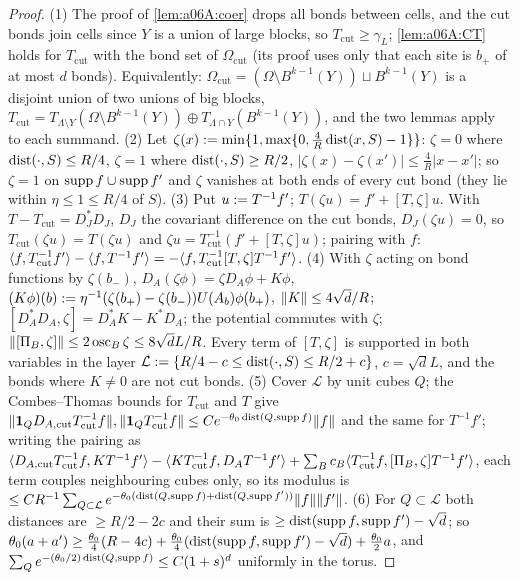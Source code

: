 \begin{proof}
(1) The proof of \cref{lem:a06A:coer} drops all bonds between cells, and the cut bonds join cells since $Y$ is a union of large blocks, so $T_{\mathrm{cut}}\ge\gamma_L$; \cref{lem:a06A:CT} holds for $T_{\mathrm{cut}}$ with the bond set of $\Omega_{\mathrm{cut}}$ (its proof uses only that each site is $b_+$ of at most $d$ bonds). Equivalently: $\Omega_{\mathrm{cut}}=(\Omega\setminus B^{k-1}(Y))\sqcup B^{k-1}(Y)$ is a disjoint union of two unions of big blocks, $T_{\mathrm{cut}}=T_{\Lambda\setminus Y}(\Omega\setminus B^{k-1}(Y))\oplus T_{\Lambda\cap Y}(B^{k-1}(Y))$, and the two lemmas apply to each summand. (2) Let $\zeta(x):=\min\{1,\max\{0,\frac4R\operatorname{dist}(x,S)-1\}\}$: $\zeta=0$ where $\operatorname{dist}(\cdot,S)\le R/4$, $\zeta=1$ where $\operatorname{dist}(\cdot,S)\ge R/2$, $|\zeta(x)-\zeta(x')|\le\frac4R|x-x'|$; so $\zeta=1$ on $\operatorname{supp} f\cup\operatorname{supp} f'$ and $\zeta$ vanishes at both ends of every cut bond (they lie within $\eta\le1\le R/4$ of $S$). (3) Put $u:= T^{-1}f'$; $T(\zeta u)=f'+[T,\zeta]u$. With $T-T_{\mathrm{cut}}=D_J^*D_J$, $D_J$ the covariant difference on the cut bonds, $D_J(\zeta u)=0$, so $T_{\mathrm{cut}}(\zeta u)=T(\zeta u)$ and $\zeta u=T_{\mathrm{cut}}^{-1}(f'+[T,\zeta]u)$; pairing with $f$: $\langle f,T_{\mathrm{cut}}^{-1}f'\rangle-\langle f,T^{-1}f'\rangle=-\langle f,T_{\mathrm{cut}}^{-1}[T,\zeta]T^{-1}f'\rangle$. (4) With $\zeta$ acting on bond functions by $\zeta(b_-)$, $D_A(\zeta\phi)=\zeta D_A\phi+K\phi$, $(K\phi)(b):=\eta^{-1}(\zeta(b_+)-\zeta(b_-))U(A_b)\phi(b_+)$, $\lVert K\rVert\le4\sqrt d/R$; $[D_A^*D_A,\zeta]=D_A^*K-K^*D_A$; the potential commutes with $\zeta$; $\lVert [\Pi_B,\zeta]\rVert\le2\operatorname{osc}_B\zeta\le8\sqrt dL/R$. Every term of $[T,\zeta]$ is supported in both variables in the layer $\mathcal L:=\{R/4-c\le\operatorname{dist}(\cdot,S)\le R/2+c\}$, $c=\sqrt dL$, and the bonds where $K\ne0$ are not cut bonds. (5) Cover $\mathcal L$ by unit cubes $Q$; the Combes--Thomas bounds for $T_{\mathrm{cut}}$ and $T$ give $\lVert \mathbf 1_QD_{A,\mathrm{cut}}T_{\mathrm{cut}}^{-1}f\rVert,\lVert \mathbf 1_QT_{\mathrm{cut}}^{-1}f\rVert\le Ce^{-\theta_0\operatorname{dist}(Q,\operatorname{supp} f)}\lVert f\rVert$ and the same for $T^{-1}f'$; writing the pairing as $\langle D_{A,\mathrm{cut}}T_{\mathrm{cut}}^{-1}f,KT^{-1}f'\rangle-\langle KT_{\mathrm{cut}}^{-1}f,D_AT^{-1}f'\rangle+\sum_Bc_B\langle T_{\mathrm{cut}}^{-1}f,[\Pi_B,\zeta]T^{-1}f'\rangle$, each term couples neighbouring cubes only, so its modulus is $\le CR^{-1}\sum_{Q\subset\mathcal L}e^{-\theta_0(\operatorname{dist}(Q,\operatorname{supp} f)+\operatorname{dist}(Q,\operatorname{supp} f'))}\lVert f\rVert\lVert f'\rVert$. (6) For $Q\subset\mathcal L$ both distances are $\ge R/2-2c$ and their sum is $\ge\operatorname{dist}(\operatorname{supp} f,\operatorname{supp} f')-\sqrt d$; so $\theta_0(a+a')\ge\frac{\theta_0}4(R-4c)+\frac{\theta_0}4(\operatorname{dist}(\operatorname{supp} f,\operatorname{supp} f')-\sqrt d)+\frac{\theta_0}2a$, and $\sum_Qe^{-(\theta_0/2)\operatorname{dist}(Q,\operatorname{supp} f)}\le C(1+s)^d$ uniformly in the torus.
\end{proof}

